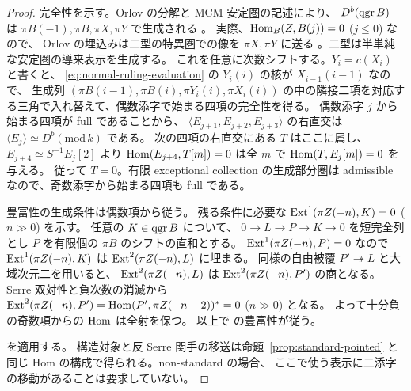 \begin{proof}
完全性を示す。Orlov の分解と MCM 安定圏の記述により、
$D^b(\operatorname{qgr} B)$ は $\pi B(-1),\pi B,\pi X,\pi Y$ で生成される
\cite[Theorem 2.5(i)]{Orlov2009}。
実際、$\operatorname{Hom}_B(Z,B(j))=0$ ($j\le0$) なので、
Orlov の埋込みは二型の特異圏での像を $\pi X,\pi Y$ に送る
\cite[Lemma 4.1]{MU2016Stable}。二型は半単純な安定圏の導来表示を生成する。
これを任意に次数シフトする。$Y_i=c(X_i)$ と書くと、
\eqref{eq:normal-ruling-evaluation} の $Y_i(i)$ の核が $X_{i-1}(i-1)$ なので、
生成列 $(\pi B(i-1),\pi B(i),\pi Y_i(i),\pi X_i(i))$
の中の隣接二項を対応する三角で入れ替えて、偶数添字で始まる四項の完全性を得る。
偶数添字 $j$ から始まる四項が full であることから、
$\langle E_{j+1},E_{j+2},E_{j+3}\rangle$ の右直交は
$\langle E_j\rangle\simeq D^b(\mathrm{mod}\,k)$ である。
次の四項の右直交にある $T$ はここに属し、
$E_{j+4}\simeq S^{-1}E_j[2]$ より
$\operatorname{Hom}(E_{j+4},T[m])=0$ は全 $m$ で $\operatorname{Hom}(T,E_j[m])=0$ を与える。
従って $T=0$。有限 exceptional collection の生成部分圏は admissible
なので、奇数添字から始まる四項も full である。

豊富性の生成条件は偶数項から従う。
残る条件に必要な $\operatorname{Ext}^1(\pi Z(-n),K)=0$ ($n\gg0$) を示す。
任意の $K\in\operatorname{qgr} B$ について、
$0\to L\to P\to K\to0$ を短完全列とし $P$ を有限個の $\pi B$ のシフトの直和とする。
$\operatorname{Ext}^1(\pi Z(-n),P)=0$ なので $\operatorname{Ext}^1(\pi Z(-n),K)$ は
$\operatorname{Ext}^2(\pi Z(-n),L)$ に埋まる。
同様の自由被覆 $P'\twoheadrightarrow L$ と大域次元二を用いると、
$\operatorname{Ext}^2(\pi Z(-n),L)$ は $\operatorname{Ext}^2(\pi Z(-n),P')$ の商となる。
Serre 双対性と負次数の消滅から
$\operatorname{Ext}^2(\pi Z(-n),P')=\operatorname{Hom}(P',\pi Z(-n-2))^*=0$ ($n\gg0$) となる。
よって十分負の奇数項からの $\operatorname{Hom}$ は全射を保つ。
以上で \cite[Definition 5.6]{MN2025} の豊富性が従う。

\cite[Theorems 5.8, 6.4 and 6.5]{MN2025} を適用する。
構造対象と反 Serre 関手の移送は命題~\ref{prop:standard-pointed}
と同じ Hom の構成で得られる。non-standard の場合、
ここで使う表示に二添字の移動があることは要求していない。
\end{proof}

